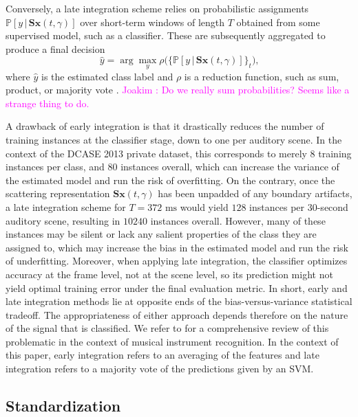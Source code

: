 \documentclass[journal]{IEEEtran}
\newcommand{\ja}[1]{\textcolor{magenta}{Joakim : #1}}
\begin{document}
Conversely, a late integration scheme relies on probabilistic assignments $\mathbb{P}\left[y \,\vert\, \mathbf{S}\boldsymbol{x}(t,\gamma) \right]$ over short-term windows of length $T$ obtained from some supervised model, such as a classifier. These are subsequently aggregated to produce a final decision
\begin{equation}
\hat{y} = \arg \max_{y} \rho\Big(\big\{ \mathbb{P}\left[y \,\vert\, \mathbf{S}\boldsymbol{x}(t,\gamma) \right] \big\}_{t} \Big)\mbox{,}
\end{equation}
where $\hat{y}$ is the estimated class label and $\rho$ is a reduction function, such as sum, product, or majority vote \cite{Kittler1998}. \ja{Do we really sum probabilities? Seems like a strange thing to do.}

A drawback of early integration is that it drastically reduces the number of training instances at the classifier stage, down to one per auditory scene.
In the context of the DCASE 2013 private dataset, this corresponds to merely $8$ training instances per class, and $80$ instances overall, which can increase the variance of the estimated model and run the risk of overfitting.
On the contrary, once the scattering representation $\mathbf{S}\boldsymbol{x}(t,\gamma)$ has been unpadded of any boundary artifacts, a late integration scheme for $T=372\textrm{ ms}$ would yield $128$ instances per $30$-second auditory scene, resulting in $10240$ instances overall.
However, many of these instances may be silent or lack any salient properties of the class they are assigned to, which may increase the bias in the estimated model and run the risk of underfitting.
Moreover, when applying late integration, the classifier optimizes accuracy at the frame level, not at the scene level, so its prediction might not yield optimal training error under the final evaluation metric.
In short, early and late integration methods lie at opposite ends of the bias-versus-variance statistical tradeoff. The appropriateness of either approach depends therefore on the nature of the signal that is classified.
We refer to \cite{Joder2009} for a comprehensive review of this problematic in the context of musical instrument recognition.
In the context of this paper, early integration refers to an averaging of the features and late integration refers to a majority vote of the predictions given by an SVM. 

\subsection{Standardization}
\label{sec:stand}
\end{document}
